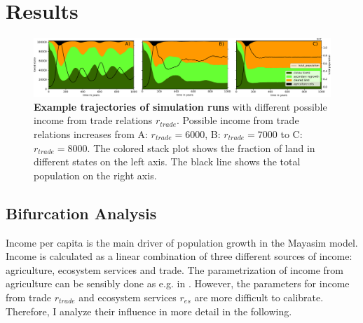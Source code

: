 \section{Results}
\begin{figure}[!t]
\centering
\includegraphics[width=\textwidth]{figures/trajectory.pdf}
\caption[Example trajectories of simulations with the MayaSim model]{\textbf{Example trajectories of simulation runs} with different possible income from trade relations $r_{trade}$. Possible income from trade relations increases from A: $r_{trade}=6000$, B: $r_{trade}=7000$ to C: $r_{trade}=8000$. The colored stack plot shows the fraction of land in different states on the left axis. The black line shows the total population on the right axis.}
\label{fig:trajectory}
\end{figure}

\subsection{Bifurcation Analysis}

Income per capita is the main driver of population growth in the Mayasim model. Income is calculated as a linear combination of three different sources of income: agriculture, ecosystem services and trade. The parametrization of income from agriculture can be sensibly done as e.g. in \cite{ertsen2018}. However, the parameters for income from trade $r_{trade}$ and ecosystem services $r_{es}$ are more difficult to calibrate. Therefore, I analyze their influence in more detail in the following.


